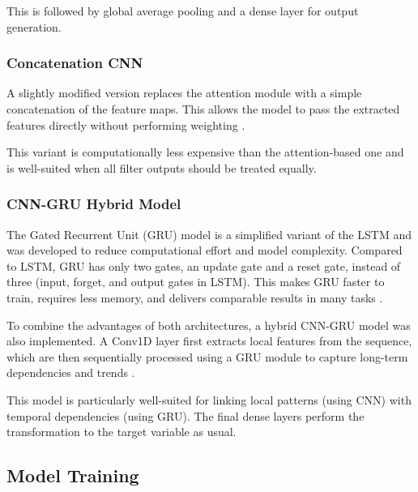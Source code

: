 This is followed by global average pooling and a dense layer for output generation.



\subsubsection{Concatenation CNN}

A slightly modified version replaces the attention module with a simple concatenation of the feature maps.
This allows the model to pass the extracted features directly without performing weighting \cite{keras-concat}.

This variant is computationally less expensive than the attention-based one and is well-suited when all filter outputs should be treated equally.



\subsubsection{CNN-GRU Hybrid Model}

The Gated Recurrent Unit (GRU) model is a simplified variant of the LSTM and was developed to reduce computational effort and model complexity.
Compared to LSTM, GRU has only two gates, an update gate and a reset gate, instead of three (input, forget, and output gates in LSTM).
This makes GRU faster to train, requires less memory, and delivers comparable results in many tasks \cite{gru-basics}.

To combine the advantages of both architectures, a hybrid CNN-GRU model was also implemented.
A Conv1D layer first extracts local features from the sequence, which are then sequentially processed using a GRU module to capture long-term dependencies and trends \cite{cnn-gru}.

This model is particularly well-suited for linking local patterns (using CNN) with temporal dependencies (using GRU).
The final dense layers perform the transformation to the target variable as usual.



\subsection{Model Training}

